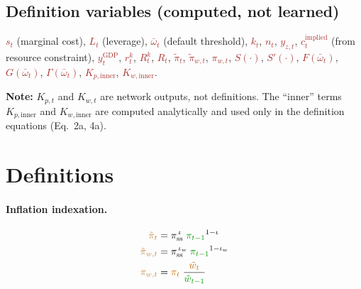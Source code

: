 \documentclass[11pt]{article}
\begin{document}
\subsection{Definition variables (computed, not learned)}

\textcolor{brown}{$s_t$} (marginal cost),
\textcolor{brown}{$L_t$} (leverage),
\textcolor{brown}{$\bar\omega_t$} (default threshold),
\textcolor{brown}{$k_t$},
\textcolor{brown}{$n_t$},
\textcolor{brown}{$y_{z,t}$},
\textcolor{brown}{$c_t^{\text{implied}}$} (from resource constraint),
\textcolor{brown}{$y_t^{\text{GDP}}$},
\textcolor{brown}{$r_t^k$},
\textcolor{brown}{$R_t^k$},
\textcolor{brown}{$R_t$},
\textcolor{brown}{$\tilde\pi_t$},
\textcolor{brown}{$\tilde\pi_{w,t}$},
\textcolor{brown}{$\pi_{w,t}$},
\textcolor{brown}{$S(\cdot)$},
\textcolor{brown}{$S'(\cdot)$},
\textcolor{brown}{$F(\bar\omega_t)$},
\textcolor{brown}{$G(\bar\omega_t)$},
\textcolor{brown}{$\Gamma(\bar\omega_t)$},
\textcolor{brown}{$K_{p,\text{inner}}$},
\textcolor{brown}{$K_{w,\text{inner}}$}.

\medskip\noindent\textbf{Note:} $K_{p,t}$ and $K_{w,t}$ are network outputs,
not definitions. The ``inner'' terms $K_{p,\text{inner}}$ and
$K_{w,\text{inner}}$ are computed analytically and used only in the
definition equations (Eq.~2a, 4a).


\section{Definitions}

\paragraph{Inflation indexation.}
\begin{align*}
  \textcolor{brown}{\tilde\pi_t}
    &= \pi_{\text{ss}}^{\,\iota}\;\textcolor{green!60!black}{\pi_{t-1}}^{1-\iota}
  \\
  \textcolor{brown}{\tilde\pi_{w,t}}
    &= \pi_{\text{ss}}^{\,\iota_w}\;\textcolor{green!60!black}{\pi_{t-1}}^{1-\iota_w}
  \\
  \textcolor{brown}{\pi_{w,t}}
    &= \textcolor{orange!80!black}{\pi_t}\;
       \frac{\textcolor{orange!80!black}{\tilde{w}_t}}{\textcolor{green!60!black}{\tilde{w}_{t-1}}}
\end{align*}
\end{document}
